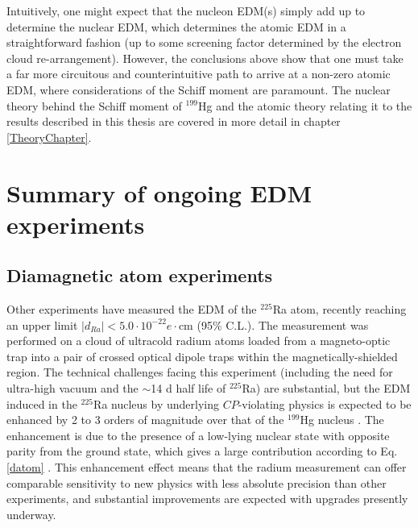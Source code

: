 \documentclass [10pt, twoside] {uwthesis}[2012/04/02]
\begin{document}
Intuitively, one might expect that the nucleon EDM(s) simply add up to determine the nuclear EDM, which determines the atomic EDM in a straightforward fashion (up to some screening factor determined by the electron cloud re-arrangement). However, the conclusions above show that one must take a far more circuitous and counterintuitive path to arrive at a non-zero atomic EDM, where considerations of the Schiff moment are paramount. The nuclear theory behind the Schiff moment of $^{199}$Hg and the atomic theory relating it to the results described in this thesis are covered in more detail in chapter \ref{TheoryChapter}.

\section{Summary of ongoing EDM experiments}
\subsection{Diamagnetic atom experiments} %
Other experiments have measured the EDM of the $^{225}${R}a atom, recently reaching an upper limit $|d_{Ra}| < 5.0\cdot 10^{-22} e\cdot \text{cm}$ (95\% C.L.)\cite{2015_Ra_EDM}. The measurement was performed on a cloud of ultracold radium atoms loaded from a magneto-optic trap into a pair of crossed optical dipole traps within the magnetically-shielded region. The technical challenges facing this experiment (including the need for ultra-high vacuum and the $\sim$14 d half life of $^{225}${R}a) are substantial, but the EDM induced in the $^{225}${R}a nucleus by underlying $CP$-violating physics is expected to be enhanced by 2 to 3 orders of magnitude over that of the $^{199}${H}g nucleus \cite{1997_Spevak_et._al._EDM_enhancement}. The enhancement is due to the presence of a low-lying nuclear state with opposite parity from the ground state, which gives a large contribution according to Eq. \ref{datom} \cite{2013_Engel_et_al_EDM_review}. This enhancement effect means that the radium measurement can offer comparable sensitivity to new physics with less absolute precision than other experiments, and substantial improvements are expected with upgrades presently underway.
\end{document}
